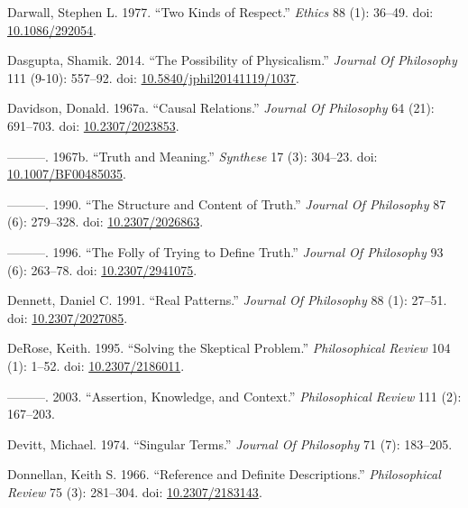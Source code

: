 \documentclass[
  10pt,
  letterpaper,
  DIV=11,
  numbers=noendperiod,
  twoside]{scrartcl}
\newlength{\cslhangindent}
\newenvironment{CSLReferences}[2] %
 {\begin{list}{}{%
  \setlength{\itemindent}{0pt}
  \setlength{\leftmargin}{0pt}
  \setlength{\parsep}{0pt}
  \ifodd #1
   \setlength{\leftmargin}{\cslhangindent}
   \setlength{\itemindent}{-1\cslhangindent}
  \fi
  \setlength{\itemsep}{#2\baselineskip}}}
 {\end{list}}
\begin{document}
\begin{CSLReferences}{1}{0}
Darwall, Stephen L. 1977. {``Two Kinds of Respect.''} \emph{Ethics} 88
(1): 36--49. doi: \href{https://doi.org/10.1086/292054}{10.1086/292054}.

Dasgupta, Shamik. 2014. {``The Possibility of Physicalism.''}
\emph{Journal Of Philosophy} 111 (9-10): 557--92. doi:
\href{https://doi.org/10.5840/jphil20141119/1037}{10.5840/jphil20141119/1037}.

Davidson, Donald. 1967a. {``Causal Relations.''} \emph{Journal Of
Philosophy} 64 (21): 691--703. doi:
\href{https://doi.org/10.2307/2023853}{10.2307/2023853}.

---------. 1967b. {``Truth and Meaning.''} \emph{Synthese} 17 (3):
304--23. doi:
\href{https://doi.org/10.1007/BF00485035}{10.1007/BF00485035}.

---------. 1990. {``The Structure and Content of Truth.''} \emph{Journal
Of Philosophy} 87 (6): 279--328. doi:
\href{https://doi.org/10.2307/2026863}{10.2307/2026863}.

---------. 1996. {``The Folly of Trying to Define Truth.''}
\emph{Journal Of Philosophy} 93 (6): 263--78. doi:
\href{https://doi.org/10.2307/2941075}{10.2307/2941075}.

Dennett, Daniel C. 1991. {``Real Patterns.''} \emph{Journal Of
Philosophy} 88 (1): 27--51. doi:
\href{https://doi.org/10.2307/2027085}{10.2307/2027085}.

DeRose, Keith. 1995. {``Solving the Skeptical Problem.''}
\emph{Philosophical Review} 104 (1): 1--52. doi:
\href{https://doi.org/10.2307/2186011}{10.2307/2186011}.

---------. 2003. {``Assertion, Knowledge, and Context.''}
\emph{Philosophical Review} 111 (2): 167--203.

Devitt, Michael. 1974. {``Singular Terms.''} \emph{Journal Of
Philosophy} 71 (7): 183--205.

Donnellan, Keith S. 1966. {``Reference and Definite Descriptions.''}
\emph{Philosophical Review} 75 (3): 281--304. doi:
\href{https://doi.org/10.2307/2183143}{10.2307/2183143}.


\end{CSLReferences}
\end{document}
